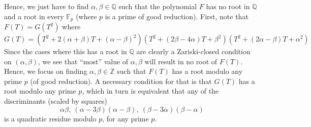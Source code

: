 \documentclass{scrartcl}
\newcommand{\Z}{\mathbb{Z}}
\newcommand{\F}{\mathbb{F}}
\newcommand{\Q}{\mathbb{Q}}
\theoremstyle{definition}
\begin{document}
Hence, we just have to find $\alpha, \beta \in \Q$ such that the polynomial $F$ has no root in $\Q$ and a root in every $\F_p$ (where $p$ is a prime of good reduction).
First, note that $F(T) = G(T^2)$ where
\begin{equation*}
    G(T) = \left( T^2 + 2(\alpha + \beta)T + (\alpha - \beta)^2 \right)\left( T^2 + (2\beta - 4\alpha)T + \beta^2 \right)\left( T^2 + (2\alpha - \beta)T + \alpha^2 \right)
\end{equation*}
Since the cases where this has a root in $\Q$ are clearly a Zariski-closed condition on $(\alpha, \beta)$, we see that ``most'' value of $\alpha, \beta$ will result in no root of $F(T)$.
Hence, we focus on finding $\alpha, \beta \in \Z$ such that $F(T)$ has a root modulo any prime $p$ (of good reduction).
A necessary condition for that is that $G(T)$ has a root modulo any prime $p$, which in turn is equivalent that any of the discriminants (scaled by squares)
\begin{equation*}
    \alpha\beta, \ (\alpha - 3\beta)(\alpha - \beta), \ (\beta - 3\alpha)(\beta - \alpha)
\end{equation*}
is a quadratic residue modulo $p$, for any prime $p$.
\end{document}
